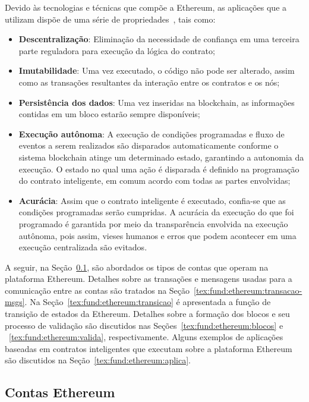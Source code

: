 Devido às tecnologias e técnicas que compõe a Ethereum, as aplicações que a utilizam dispõe de uma série de propriedades~\cite{ethereum2014whitepaper, survey-Hewa2021smart-contract}, tais como:
\begin{itemize}
    \item \textbf{Descentralização}: Eliminação da necessidade de confiança em uma terceira parte reguladora para execução da lógica do contrato;
    \item \textbf{Imutabilidade}: Uma vez executado, o código não pode ser alterado, assim como as transações resultantes da interação entre os contratos e os nós;
    \item \textbf{Persistência dos dados}: Uma vez inseridas na blockchain, as informações contidas em um bloco estarão sempre disponíveis;
    \item \textbf{Execução autônoma}: A execução de condições programadas e fluxo de eventos a serem realizados são disparados automaticamente conforme o sistema blockchain atinge um determinado estado, garantindo a autonomia da execução. O estado no qual uma ação é disparada é definido na programação do contrato inteligente, em comum acordo com todas as partes envolvidas;
    \item \textbf{Acurácia}: Assim que o contrato inteligente é executado, confia-se que as condições programadas serão cumpridas. A acurácia da execução do que foi programado é garantida por meio da transparência envolvida na execução autônoma, pois assim, vieses humanos e erros que podem acontecer em uma execução centralizada são evitados.
\end{itemize}

A seguir, na Seção~\ref{tex:fund:ethereum:clientes}, são abordados os tipos de contas que operam na plataforma Ethereum. Detalhes sobre as transações e mensagens usadas para a comunicação entre as contas são tratados na Seção~\ref{tex:fund:ethereum:transacao-msgs}. Na Seção~\ref{tex:fund:ethereum:transicao} é apresentada a função de transição de estados da Ethereum. Detalhes sobre a formação dos blocos e seu processo de validação são discutidos nas Seções~\ref{tex:fund:ethereum:blocos} e ~\ref{tex:fund:ethereum:valida}, respectivamente. Alguns exemplos de aplicações baseadas em contratos inteligentes que executam sobre a plataforma Ethereum são discutidos na Seção~\ref{tex:fund:ethereum:aplica}. 

\subsection{Contas Ethereum} \label{tex:fund:ethereum:clientes}

